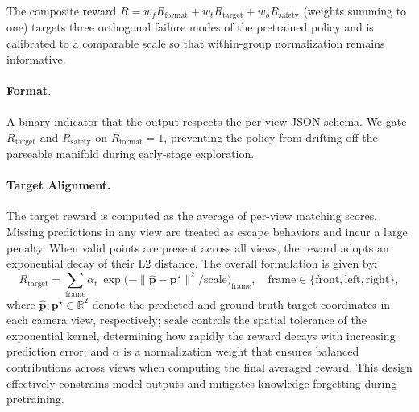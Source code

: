 The composite reward
$R\!=\!w_f R_{\mathrm{format}}\!+\!w_t R_{\mathrm{target}}\!+\!w_o R_{\mathrm{safety}}$
(weights summing to one) targets three orthogonal failure modes of
the pretrained policy and is calibrated to a comparable scale so that
within-group normalization remains informative.

\paragraph{Format.}
A binary indicator that the output respects the per-view JSON schema.
We gate $R_{\mathrm{target}}$ and $R_{\mathrm{safety}}$ on
$R_{\mathrm{format}}{=}1$, preventing the policy from drifting off
the parseable manifold during early-stage exploration.

\paragraph{Target Alignment.}
The target reward is computed as the average of per-view matching scores. Missing predictions in any view are treated as escape behaviors and incur a large penalty. When valid points are present across all views, the reward adopts an exponential decay of their L2 distance. The overall formulation is given by:
\begin{equation}
    R_{\mathrm{target}}\!=\!\sum_{\mathrm{frame}}\alpha_t\ {\exp\bigl(-\|\hat{\mathbf{p}}-\mathbf{p}^{\star}\|^2/\mathrm{scale}\bigr)}_{\mathrm{frame}}, \quad \mathrm{frame}\in\{\mathrm{front}, \mathrm{left}, \mathrm{right}\},
\end{equation}
where $\hat{\mathbf{p}},\mathbf{p}^{\star} \in \mathbb{R}^2$ denote the predicted and ground-truth target coordinates in each camera view, respectively; $\mathrm{scale}$ controls the spatial tolerance of the exponential kernel, determining how rapidly the reward decays with increasing prediction error; and $\alpha$ is a normalization weight that ensures balanced contributions across views when computing the final averaged reward. This design effectively constrains model outputs and mitigates knowledge forgetting during  pretraining.

